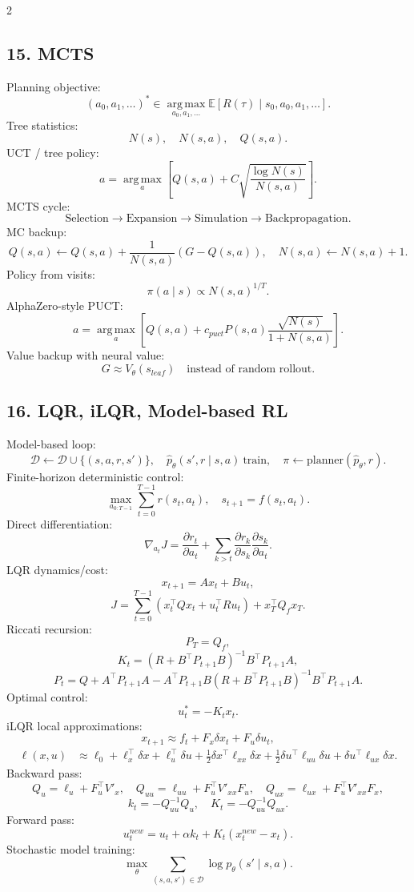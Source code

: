 \documentclass[8pt,a4paper]{extarticle}
\newcommand{\E}{\mathbb E}
\newcommand{\argmax}{\operatorname*{arg\,max}}
\newcommand{\cD}{\mathcal D}
\newcommand{\1}{\mathbf 1}
\begin{document}
\begin{multicols*}{2}
\subsection*{15. MCTS}
Planning objective:
\[
(a_0,a_1,\dots)^*\in\argmax_{a_0,a_1,\dots}\E[R(\tau)\mid s_0,a_0,a_1,\dots].
\]
Tree statistics:
\[
N(s),\quad N(s,a),\quad Q(s,a).
\]
UCT / tree policy:
\[
a=\argmax_a\left[Q(s,a)+C\sqrt{\frac{\log N(s)}{N(s,a)}}\right].
\]
MCTS cycle:
\[
\text{Selection}\to\text{Expansion}\to\text{Simulation}\to\text{Backpropagation}.
\]
MC backup:
\[
Q(s,a)\leftarrow Q(s,a)+\frac1{N(s,a)}(G-Q(s,a)),
\quad N(s,a)\leftarrow N(s,a)+1.
\]
Policy from visits:
\[
\pi(a\mid s)\propto N(s,a)^{1/T}.
\]
AlphaZero-style PUCT:
\[
a=\argmax_a\left[Q(s,a)+c_{puct}P(s,a)\frac{\sqrt{N(s)}}{1+N(s,a)}\right].
\]
Value backup with neural value:
\[
G\approx V_\theta(s_{leaf})\quad\text{instead of random rollout}.
\]

\subsection*{16. LQR, iLQR, Model-based RL}
Model-based loop:
\[
\cD\leftarrow\cD\cup\{(s,a,r,s')\},
\quad \hat p_\theta(s',r\mid s,a)\ \text{train},
\quad \pi\leftarrow\text{planner}(\hat p_\theta,r).
\]
Finite-horizon deterministic control:
\[
\max_{a_{0:T-1}}\sum_{t=0}^{T-1}r(s_t,a_t),
\quad s_{t+1}=f(s_t,a_t).
\]
Direct differentiation:
\[
\nabla_{a_t}J=\frac{\partial r_t}{\partial a_t}+\sum_{k>t}\frac{\partial r_k}{\partial s_k}\frac{\partial s_k}{\partial a_t}.
\]
LQR dynamics/cost:
\[
x_{t+1}=Ax_t+Bu_t,
\]
\[
J=\sum_{t=0}^{T-1}(x_t^\top Qx_t+u_t^\top Ru_t)+x_T^\top Q_f x_T.
\]
Riccati recursion:
\[
P_T=Q_f,
\]
\[
K_t=(R+B^\top P_{t+1}B)^{-1}B^\top P_{t+1}A,
\]
\[
P_t=Q+A^\top P_{t+1}A-A^\top P_{t+1}B(R+B^\top P_{t+1}B)^{-1}B^\top P_{t+1}A.
\]
Optimal control:
\[
u_t^*=-K_t x_t.
\]
iLQR local approximations:
\[
x_{t+1}\approx f_t+F_x\delta x_t+F_u\delta u_t,
\]
\[
\begin{aligned}
\ell(x,u)&\approx \ell_0+\ell_x^\top\delta x+\ell_u^\top\delta u+
\tfrac12\delta x^\top\ell_{xx}\delta x+\tfrac12\delta u^\top\ell_{uu}\delta u+\delta u^\top\ell_{ux}\delta x.
\end{aligned}
\]
Backward pass:
\[
Q_u=\ell_u+F_u^\top V'_x,
\quad Q_{uu}=\ell_{uu}+F_u^\top V'_{xx}F_u,
\quad Q_{ux}=\ell_{ux}+F_u^\top V'_{xx}F_x,
\]
\[
k_t=-Q_{uu}^{-1}Q_u,
\quad K_t=-Q_{uu}^{-1}Q_{ux}.
\]
Forward pass:
\[
u_t^{new}=u_t+\alpha k_t+K_t(x_t^{new}-x_t).
\]
Stochastic model training:
\[
\max_\theta\sum_{(s,a,s')\in\cD}\log p_\theta(s'\mid s,a).
\]

\end{multicols*}
\end{document}
